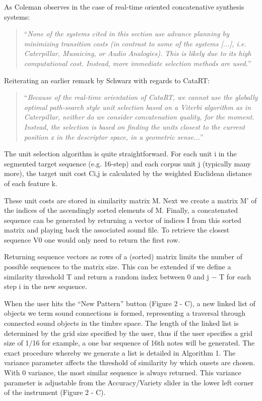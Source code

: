 As Coleman observes in the case of real-time oriented concatenative synthesis systems:

\blockcquote[]{Coleman2015}{``\textit{None of the systems cited in this section use advance planning by minimizing transition costs (in contrast to some of the systems [...], i.e. Caterpillar, Musaicing, or Audio Analogies). This is likely due to its high computational cost. Instead, more immediate selection methods are used.}''}

Reiterating an earlier remark by Schwarz with regards to CataRT:

\blockcquote[]{Schwarz2006b}{``\textit{Because of the real-time orientation of CataRT, we cannot use the globally optimal path-search style unit selection based on a Viterbi algorithm as in Caterpillar, neither do we consider concatenation quality, for the moment. Instead, the selection is based on finding the units closest to the current position x in the descriptor space, in a geometric sense...}''}

The unit selection algorithm is quite straightforward. For each unit i in the segmented target sequence (e.g. 16-step) and each corpus unit j (typically many more), the target unit cost Ci,j is calculated by the weighted Euclidean distance of each feature k.

These unit costs are stored in similarity matrix M. Next we create a matrix M’ of the indices of the ascendingly sorted elements of M. Finally, a concatenated sequence can be generated by returning a vector of indices I from this sorted matrix and playing back the associated sound file. To retrieve the closest sequence V0 one would only need to return the first row.

Returning sequence vectors as rows of a (sorted) matrix limits the number of possible sequences to the matrix size. This can be extended if we define a similarity threshold T and return a random index between 0 and j − T for each step i in the new sequence.

When the user hits the “New Pattern” button (Figure 2 - C), a new linked list of objects we term sound connections is formed, representing a traversal through connected sound objects in the timbre space. The length of the linked list is determined by the grid size specified by the user, thus if the user specifies a grid size of 1/16 for example, a one bar sequence of 16th notes will be generated. The exact procedure whereby we generate a list is detailed in Algorithm 1. The variance parameter affects the threshold of similarity by which onsets are chosen. With 0 variance, the most similar sequence is always returned. This variance parameter is adjustable from the Accuracy/Variety slider in the lower left corner of the instrument (Figure 2 - C).

